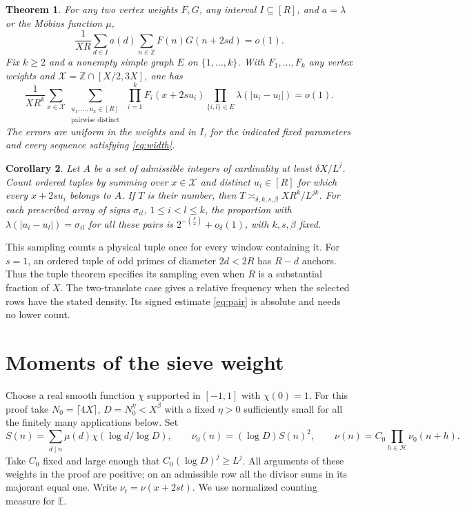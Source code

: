 \documentclass[11pt]{article}
\newtheorem{theorem}{Theorem}[section]
\newtheorem{corollary}[theorem]{Corollary}
\newcommand{\E}{\mathbb E}
\newcommand{\Z}{\mathbb Z}
\begin{document}
\begin{theorem}\label{th:weighted}
For any two vertex weights \(F,G\), any interval \(I\subseteq[R]\), and
\(a=\lambda\) or the M\"obius function \(\mu\),
\begin{equation}\label{eq:pair}
       \frac{1}{XR}\sum_{d\in I} a(d)\sum_{n\in\Z}F(n)G(n+2sd)=o(1).
\end{equation}
Fix \(k\ge2\) and a nonempty simple graph \(E\) on \(\{1,\ldots,k\}\).
With \(F_1,\ldots,F_k\) any vertex weights and
\(\mathcal X=\Z\cap[X/2,3X]\), one has
\begin{equation}\label{eq:graph}
 \frac{1}{XR^k}\sum_{x\in\mathcal X}
 \sum_{\substack{u_1,\ldots,u_k\in[R]\\\text{pairwise distinct}}}
 \ \prod_{i=1}^k F_i(x+2su_i)
 \prod_{\{i,l\}\in E}\lambda(|u_i-u_l|)=o(1).
\end{equation}
The errors are uniform in the weights and in \(I\), for the indicated fixed
parameters and every sequence satisfying \eqref{eq:width}.
\end{theorem}

\begin{corollary}\label{co:tuple}
Let \(A\) be a set of admissible integers of cardinality at least
\(\delta X/L^j\). Count ordered tuples by summing over \(x\in\mathcal X\)
and distinct \(u_i\in[R]\) for which every \(x+2su_i\) belongs to \(A\).
If \(T\) is their number, then \(T\asymp_{\delta,k,s,\beta} XR^k/L^{jk}\).
For each prescribed array of signs
\(\sigma_{il}\), \(1\le i<l\le k\), the proportion with
\(\lambda(|u_i-u_l|)=\sigma_{il}\) for all these pairs is
\(2^{-\binom{k}{2}}+o_\delta(1)\), with \(k,s,\beta\) fixed.
\end{corollary}

This sampling counts a physical tuple once for every window containing it.
For \(s=1\), an ordered tuple of odd primes of diameter \(2d<2R\)
has \(R-d\) anchors. Thus the tuple theorem specifies its sampling even
when \(R\) is a substantial fraction of \(X\). The two-translate case gives a
relative frequency when the selected rows have the stated density.
Its signed estimate \eqref{eq:pair} is absolute and needs no lower count.

\section{Moments of the sieve weight}
Choose a real smooth function \(\chi\) supported in \([-1,1]\) with
\(\chi(0)=1\). For this proof take \(N_0=\lceil4X\rceil\),
\(D=N_0^\eta<X^\beta\) with a fixed \(\eta>0\) sufficiently small for all
the finitely many applications below. Set
\[
 S(n)=\sum_{d\mid n}\mu(d)\chi(\log d/\log D),\qquad
 \nu_0(n)=(\log D)S(n)^2,\qquad
 \nu(n)=C_0\prod_{h\in\mathcal H}\nu_0(n+h).
\]
Take \(C_0\) fixed and large enough that \(C_0(\log D)^j\ge L^j\).
All arguments of these weights in the proof are positive; on an admissible
row all the divisor sums in its majorant equal one. Write \(\nu_t=\nu(x+2st)\).
We use normalized counting measure for \(\E\).
\end{document}
